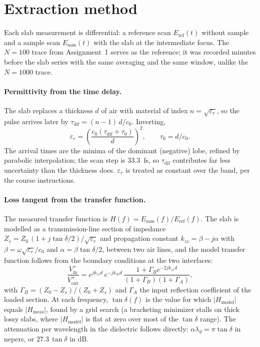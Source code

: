\documentclass[10pt,a4paper]{article}
\begin{document}
\section{Extraction method}
\label{sec:method}

Each slab measurement is differential: a reference scan $E_{\mathrm{ref}}(t)$ without sample and a sample scan $E_{\mathrm{sam}}(t)$ with the slab at the intermediate focus. The $N=100$ trace from Assignment~1 serves as the reference; it was recorded minutes before the slab series with the same averaging and the same window, unlike the $N=1000$ trace.

\paragraph{Permittivity from the time delay.}
The slab replaces a thickness $d$ of air with material of index $n = \sqrt{\varepsilon_r}$, so the pulse arrives later by $\tau_{\mathrm{dif}} = (n-1)\,d/c_0$. Inverting,
\begin{equation}
  \varepsilon_r = \left(\frac{c_0(\tau_{\mathrm{dif}} + \tau_0)}{d}\right)^{\!2},
  \qquad \tau_0 = d/c_0 .
  \label{eq:eps}
\end{equation}
The arrival times are the minima of the dominant (negative) lobe, refined by parabolic interpolation; the scan step is \qty{33.3}{fs}, so $\tau_{\mathrm{dif}}$ contributes far less uncertainty than the thickness does. $\varepsilon_r$ is treated as constant over the band, per the course instructions.

\paragraph{Loss tangent from the transfer function.}
The measured transfer function is $H(f) = E_{\mathrm{sam}}(f)/E_{\mathrm{ref}}(f)$. The slab is modelled as a transmission-line section of impedance $Z_s = Z_0\,(1 + j\tan\delta/2)/\sqrt{\varepsilon_r}$ and propagation constant $k_{zs} = \beta - j\alpha$ with $\beta = \omega\sqrt{\varepsilon_r}/c_0$ and $\alpha = \beta\tan\delta/2$, between two air lines, and the model transfer function follows from the boundary conditions at the two interfaces:
\begin{equation}
  \frac{V^+_{\mathrm{in}}}{V^+_{\mathrm{out}}}
  = e^{jk_{zs}d}\,e^{-jk_{z0}d}\,
    \frac{1 + \Gamma_B e^{-2jk_{zs}d}}{(1+\Gamma_B)(1+\Gamma_A)} ,
  \label{eq:tl}
\end{equation}
with $\Gamma_B = (Z_0 - Z_s)/(Z_0 + Z_s)$ and $\Gamma_A$ the input reflection coefficient of the loaded section. At each frequency, $\tan\delta(f)$ is the value for which $|H_{\mathrm{model}}|$ equals $|H_{\mathrm{meas}}|$, found by a grid search (a bracketing minimizer stalls on thick lossy slabs, where $|H_{\mathrm{model}}|$ is flat at zero over most of the $\tan\delta$ range). The attenuation per wavelength in the dielectric follows directly: $\alpha\lambda_d = \pi\tan\delta$ in nepers, or $27.3\,\tan\delta$ in dB.
\end{document}
